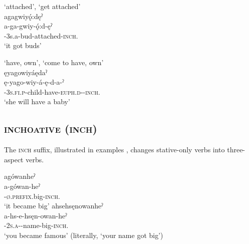 \ea\label{ex:inchex31}  ‘attached’,  ‘get attached’ \\
agagwiyǫ́:dęˀ\\
\gll a-ga-gwiy-ǫ́:d-ęˀ\\
    {\factual-3s.a}-bud-attached-\textsc{inch.\zeropunctual}\\
\glt `it got buds'
\z 


\ea\label{ex:inchex4}  ‘have, own’,  ‘come to have, own’  \\
ęyagowiyáędaˀ\\
\gll ę-yago-wiy-á-ę-d-a-ˀ\\
    \textsc{\future-3s.fi.p}-child-have-\textsc{euph.d-\joinerA-inch.\zeropunctual} \\
\glt `she will have a baby'
\z



\subsection{ \textsc{inchoative} (\textsc{inch})} \label{[-heˀ] (inchoative)}

The  \textsc{inch} suffix, illustrated in examples , changes stative-only verbs into three-aspect verbs.

\ea\label{ex:heinchex}
\ea agówanheˀ\\
\gll a-gówan-heˀ\\
 {\factual}-\textsc{ø.prefix}.big-\textsc{inch}.{\zeropunctual}\\
\glt `it became big'
 \ex ahsehsęnowanheˀ\\
 \gll a-hs-e-hsęn-owan-heˀ\\
 {\factual}-\textsc{2s.a-\joinerE}-name-big-\textsc{inch}.\zeropunctual\\
 \glt `you became famous' (literally, `your name got big')
\z 
\z 

